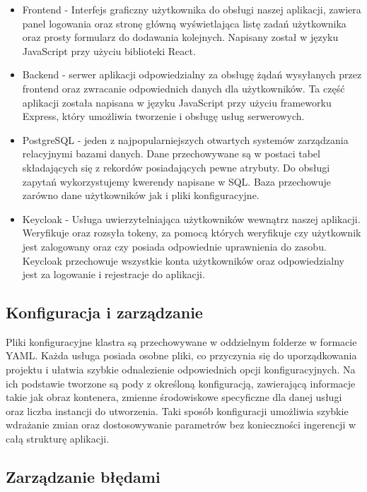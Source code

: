 \documentclass[12pt,a4paper]{article}
\begin{document}
\begin{itemize}
    \item Frontend - Interfejs graficzny użytkownika do obsługi naszej aplikacji, zawiera panel logowania oraz stronę główną wyświetlająca listę zadań użytkownika oraz prosty formularz do dodawania kolejnych. Napisany został w języku JavaScript przy użyciu biblioteki React. 
    \item Backend - serwer aplikacji odpowiedzialny za obsługę żądań wysyłanych przez frontend oraz zwracanie odpowiednich danych dla użytkowników. Ta część aplikacji została napisana w języku JavaScript przy użyciu frameworku Express, który umożliwia tworzenie i obsługę usług serwerowych.
    \item PostgreSQL - jeden z najpopularniejszych otwartych systemów zarządzania relacyjnymi bazami danych. Dane przechowywane są w postaci tabel składających się z rekordów posiadających pewne atrybuty. Do obsługi zapytań wykorzystujemy kwerendy napisane w SQL. Baza przechowuje zarówno dane użytkowników jak i pliki konfiguracyjne.
    \item Keycloak - Usługa uwierzytelniająca użytkowników wewnątrz naszej aplikacji. Weryfikuje oraz rozsyła tokeny, za pomocą których weryfikuje czy użytkownik jest zalogowany oraz czy posiada odpowiednie uprawnienia do zasobu. Keycloak przechowuje wszystkie konta użytkowników oraz odpowiedzialny jest za logowanie i rejestracje do aplikacji.
\end{itemize}

\subsection{Konfiguracja i zarządzanie}
\label{sec:NonFunctionalConditions}

Pliki konfiguracyjne klastra są przechowywane w oddzielnym folderze w formacie YAML. Każda usługa posiada osobne pliki, co przyczynia się do uporządkowania projektu i ułatwia szybkie odnalezienie odpowiednich opcji konfiguracyjnych. Na ich podstawie tworzone są pody z określoną konfiguracją, zawierającą informacje takie jak obraz kontenera, zmienne środowiskowe specyficzne dla danej usługi oraz liczba instancji do utworzenia. Taki sposób konfiguracji umożliwia szybkie wdrażanie zmian oraz dostosowywanie parametrów bez konieczności ingerencji w całą strukturę aplikacji.

\subsection{Zarządzanie błędami}
\label{sec:ERD} 
\end{document}
